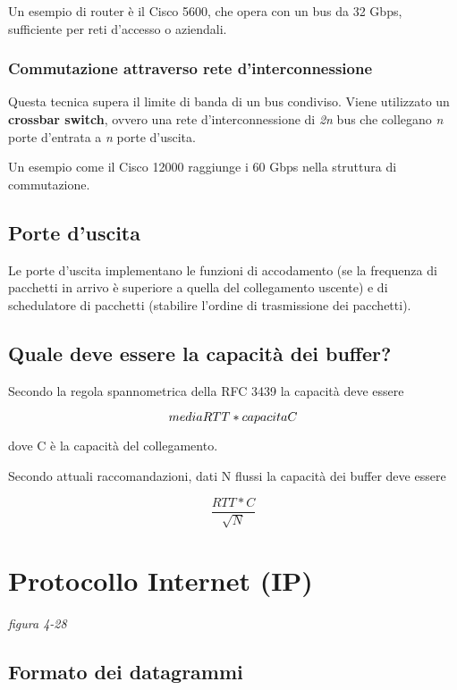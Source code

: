\documentclass[
]{article}
\begin{document}
Un esempio di router è il Cisco 5600, che opera con un bus da 32 Gbps,
sufficiente per reti d'accesso o aziendali.

\hypertarget{header-n75}{%
\subsubsection{Commutazione attraverso rete
d'interconnessione}\label{header-n75}}

Questa tecnica supera il limite di banda di un bus condiviso. Viene
utilizzato un \textbf{crossbar switch}, ovvero una rete
d'interconnessione di \emph{2n} bus che collegano \emph{n} porte
d'entrata a \emph{n} porte d'uscita.

Un esempio come il Cisco 12000 raggiunge i 60 Gbps nella struttura di
commutazione.

\hypertarget{header-n78}{%
\subsection{Porte d'uscita}\label{header-n78}}

Le porte d'uscita implementano le funzioni di accodamento (se la
frequenza di pacchetti in arrivo è superiore a quella del collegamento
uscente) e di schedulatore di pacchetti (stabilire l'ordine di
trasmissione dei pacchetti).

\hypertarget{header-n80}{%
\subsection{Quale deve essere la capacità dei
buffer?}\label{header-n80}}

Secondo la regola spannometrica della RFC 3439 la capacità deve essere

\[media \space RTT \space*\space capacita \space C\]

dove C è la capacità del collegamento.

Secondo attuali raccomandazioni, dati N flussi la capacità dei buffer
deve essere

\[\frac{RTT*C}{\sqrt{N}}\]

\hypertarget{header-n86}{%
\section{Protocollo Internet (IP)}\label{header-n86}}

\emph{figura 4-28}

\hypertarget{header-n88}{%
\subsection{Formato dei datagrammi}\label{header-n88}}
\end{document}
